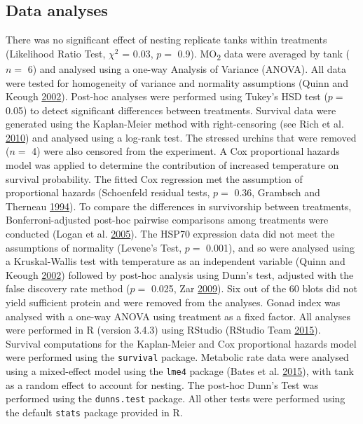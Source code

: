 \documentclass[a4paper,10pt, oneside]{memoir}
\begin{document}
\hypertarget{data-analyses}{%
\subsection{Data analyses}\label{data-analyses}}

There was no significant effect of nesting replicate tanks within treatments (Likelihood Ratio Test, \(\chi^2\) = 0.03, \(p =\) 0.9). MO\textsubscript{2} data were averaged by tank (\(n =\) 6) and analysed using a one-way Analysis of Variance (ANOVA).
All data were tested for homogeneity of variance and normality assumptions (Quinn and Keough \protect\hyperlink{ref-Quinn2002}{2002}). Post-hoc analyses were performed using Tukey's HSD test (\(p =\) 0.05) to detect significant differences between treatments.
Survival data were generated using the Kaplan-Meier method with right-censoring (see Rich et al. \protect\hyperlink{ref-Rich2010}{2010}) and analysed using a log-rank test.
The stressed urchins that were removed (\(n =\) 4) were also censored from the experiment.
A Cox proportional hazards model was applied to determine the contribution of increased temperature on survival probability.
The fitted Cox regression met the assumption of proportional hazards (Schoenfeld residual tests, \(p =\) 0.36, Grambsch and Therneau \protect\hyperlink{ref-Grambsch1994}{1994}).
To compare the differences in survivorship between treatments, Bonferroni-adjusted post-hoc pairwise comparisons among treatments were conducted (Logan et al. \protect\hyperlink{ref-Logan2005}{2005}).
The HSP70 expression data did not meet the assumptions of normality (Levene's Test, \(p =\) 0.001), and so were analysed using a Kruskal-Wallis test with temperature as an independent variable (Quinn and Keough \protect\hyperlink{ref-Quinn2002}{2002}) followed by post-hoc analysis using Dunn's test, adjusted with the false discovery rate method (\(p =\) 0.025, Zar \protect\hyperlink{ref-Zar2009}{2009}).
Six out of the 60 blots did not yield sufficient protein and were removed from the analyses.
Gonad index was analysed with a one-way ANOVA using treatment as a fixed factor.
All analyses were performed in R (version 3.4.3) using RStudio (RStudio Team \protect\hyperlink{ref-RStudioTeam2015}{2015}).
Survival computations for the Kaplan-Meier and Cox proportional hazards model were performed using the \texttt{survival} package.
Metabolic rate data were analysed using a mixed-effect model using the \texttt{lme4} package (Bates et al. \protect\hyperlink{ref-Bates2015}{2015}), with tank as a random effect to account for nesting. The post-hoc Dunn's Test was performed using the \texttt{dunns.test} package.
All other tests were performed using the default \texttt{stats} package provided in R.
\end{document}
